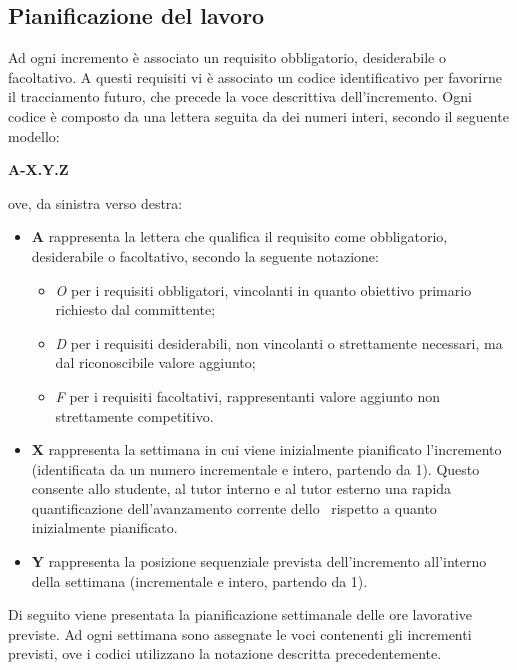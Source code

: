 \subsection{Pianificazione del lavoro}
\label{sec:pianificazione}
Ad ogni incremento è associato un requisito obbligatorio, desiderabile o facoltativo.
A questi requisiti vi è associato un codice identificativo per favorirne il tracciamento futuro, che precede la voce descrittiva dell'incremento.
\noindent
Ogni codice è composto da una lettera seguita da dei numeri interi, secondo il seguente modello:
\begin{center}
	\textbf{A-X.Y.Z}
\end{center}
ove, da sinistra verso destra:
\begin{itemize}

  \item \textbf{A} rappresenta la lettera che qualifica il requisito come obbligatorio, desiderabile o facoltativo, secondo la seguente notazione:
  \begin{itemize}
  	\item \textit{O} per i requisiti obbligatori, vincolanti in quanto obiettivo primario richiesto dal committente;
  	\item \textit{D} per i requisiti desiderabili, non vincolanti o strettamente necessari,
  		  ma dal riconoscibile valore aggiunto;
  	\item \textit{F} per i requisiti facoltativi, rappresentanti valore aggiunto non strettamente
  		  competitivo.
  \end{itemize}

  \item \textbf{X} rappresenta la settimana in cui viene inizialmente pianificato l'incremento (identificata da un numero incrementale e intero, partendo da 1).
  Questo consente allo studente, al tutor interno e al tutor esterno una rapida quantificazione dell'avanzamento corrente dello \stage\ rispetto a quanto inizialmente pianificato.

  \item \textbf{Y} rappresenta la posizione sequenziale prevista dell’incremento all’interno della settimana (incrementale e intero, partendo da 1).


\end{itemize}
Di seguito viene presentata la pianificazione settimanale delle ore lavorative previste.
Ad ogni settimana sono assegnate le voci contenenti gli incrementi previsti, ove i codici utilizzano la notazione descritta precedentemente.

